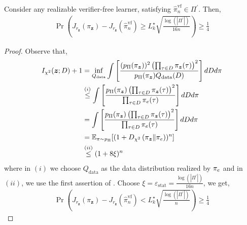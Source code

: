 \begin{lemma}
Consider any realizable verifier-free learner, satisfying $\hat{\pi}_n^{\text{vf}} \in \Pi^\prime$. Then,
\begin{align*}
    \Pr \left( J_{r_{\bm{z}}} (\pi_{\bm{z}}) - J_{r_{\bm{z}}} (\hat{\pi}_n^{\text{vf}}) \ge L_k^\star\sqrt{\frac{\log(|\Pi^\prime|)}{16n}} \right) \ge \frac{1}{4}
\end{align*}
\end{lemma}
\begin{proof}
Observe that,
\begin{align*}
    I_{\chi^2} (\bm{z}; D) + 1 &= \inf_{Q_{\text{data}}} \int \left[ \frac{(p_\Pi (\pi_{\bm{z}}))^2 \left( \prod_{\tau \in D} \pi_{\bm{z}} (\tau) \right)^2}{p_\Pi (\pi_{\bm{z}}) Q_{\text{data}} (D)} \right] dD d\pi \\
    &\overset{(i)}{\le} \int \left[ \frac{p_\Pi (\pi_{\bm{z}}) \left( \prod_{\tau \in D} \pi_{\bm{z}} (\tau) \right)^2}{\prod_{\tau \in D} \pi_e (\tau)} \right] dD d\pi \\
    &= \int \left[ \frac{p_\Pi (\pi_{\bm{z}}) \left( \prod_{\tau \in D} \pi_{\bm{z}} (\tau) \right)^2}{\prod_{\tau \in D} \pi_e (\tau)} \right] dD d\pi \\
    &= \mathbb{E}_{\pi \sim p_\Pi} [ (1+D_{\chi^2} \left( \pi_{\bm{z}} \| \pi_e \right))^n ] \\
    &\overset{(ii)}{\le} (1+8\xi)^n
\end{align*}
where in $(i)$ we choose $Q_{\text{data}}$ as the data distribution realized by $\pi_e$ and in $(ii)$, we use the first assertion of .
Choose $\xi = \varepsilon_{\text{stat}} = \frac{\log(
|\Pi^\prime|)}{16n}$, we get,
\begin{align*}
    \Pr \left( J_{r_{\bm{z}}} (\pi_{\bm{z}}) - J_{r_{\bm{z}}} (\hat{\pi}_n^{\text{vf}}) < L_k^\star\sqrt{\frac{\log(|\Pi^\prime|)}{n}} \right) \ge \frac{1}{4}
\end{align*}
\end{proof}





























